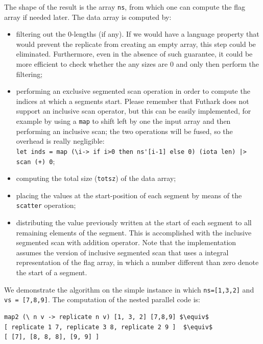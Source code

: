 \documentclass[acmsmall,review]{acmart}\settopmatter{printfolios=true,printccs=false,printacmref=false}
\begin{document}
The shape of the result is the array {\tt ns}, from which one can
compute the flag array if needed later.   The data array is computed by:
\begin{itemize}
    \item filtering out the $0$-lengths (if any). If we would 
            have a language property that would prevent the replicate
            from creating an empty array, this step could be eliminated.
            Furthermore, even in the absence of such guarantee, it
            could be more efficient to check whether the any sizes
            are $0$ and only then perform the filtering;  
    \item performing an exclusive segmented scan operation in order
            to compute the indices at which a segments start.
          Please remember that Futhark does not support an inclusive
            scan operator, but this can be easily implemented,
            for example by using a \lstinline{map} to shift left by one
            the input array and then performing an inclusive scan;
            the two operations will be fused, so the overhead is really 
            negligible:\\
            \lstinline{let inds = map (\i-> if i>0 then ns'[i-1] else 0) (iota len) |> scan (+) 0};
    \item computing the total size ({\tt totsz}) of the data array;
    \item placing the values at the start-position of each segment
            by means of the \lstinline{scatter} operation;
    \item distributing the value previously written at the start of
            each segment to all remaining elements of the segment.
            This is accomplished with the inclusive segmented
            scan with addition operator. Note that the implementation
            assumes the version of inclusive segmented scan that uses
            a integral representation of the flag array, in which
            a number different than zero denote the start of a segment. 
\end{itemize}

We demonstrate the algorithm on the simple instance in which {\tt ns=[1,3,2]}
and {\tt vs = [7,8,9]}.
The computation of the nested parallel code is:
\begin{lstlisting}[mathescape=true]
map2 (\ n v -> replicate n v) [1, 3, 2] [7,8,9] $\equiv$
[ replicate 1 7, replicate 3 8, replicate 2 9 ]  $\equiv$
[ [7], [8, 8, 8], [9, 9] ]
\end{lstlisting}\vspace{-2ex}
\end{document}

